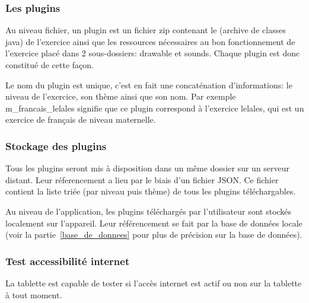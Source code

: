 \subsubsection{Les plugins}
Au niveau fichier, un plugin est un fichier \og{}zip\fg{} contenant le \jar{} (archive de classes java) de l'exercice ainsi que les ressources nécessaires au bon fonctionnement de l'exercice placé dans 2 sous-dossiers: \og{}drawable\fg{} et \og{}sounds\fg{}. Chaque plugin est donc constitué de cette façon.

Le nom du plugin est unique, c'est en fait une concaténation d'informations: le niveau de l'exercice, son thème ainsi que son nom. Par exemple \og{}m\_francais\_lelales\fg{} signifie que ce plugin correspond à l'exercice \og{}lelales\fg{}, qui est un exercice de français de niveau maternelle.

\subsubsection{Stockage des plugins}
\label{importation_plugin-stockage}
Tous les plugins seront mis à disposition dans un même dossier sur un serveur distant. Leur réferencement a lieu par le biais d'un fichier JSON. Ce fichier contient la liste triée (par niveau puis thème) de tous les plugins téléchargables.

Au niveau de l'application, les plugins téléchargés par l'utilisateur sont stockés localement sur l'appareil. Leur référencement se fait par la base de données locale (voir la partie~\ref{base_de_donnees} pour plus de précision sur la base de données).

\subsubsection{Test accessibilité internet}
La tablette est capable de tester si l'accès internet est actif ou non sur la tablette à tout moment.

